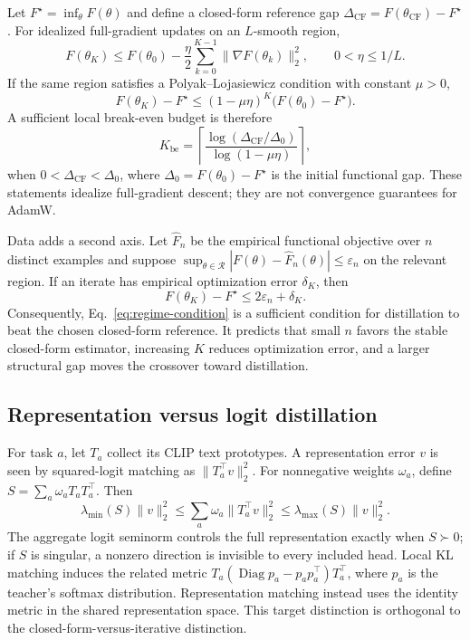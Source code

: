 \documentclass[letterpaper]{article} %
\theoremstyle{plain}
\theoremstyle{definition}
\begin{document}
Let $F^\star=\inf_\theta F(\theta)$ and define a closed-form reference gap $\Delta_{\mathrm{CF}}=F(\theta_{\mathrm{CF}})-F^\star$.
For idealized full-gradient updates on an $L$-smooth region,
\begin{equation}
F(\theta_K)
\le F(\theta_0)-\frac{\eta}{2}
\sum_{k=0}^{K-1}\|\nabla F(\theta_k)\|_2^2,
\qquad 0<\eta\le 1/L.
\label{eq:compute-descent-main}
\end{equation}
If the same region satisfies a Polyak--Lojasiewicz condition with constant $\mu>0$,
\begin{equation}
F(\theta_K)-F^\star
\le(1-\mu\eta)^K\bigl(F(\theta_0)-F^\star\bigr).
\label{eq:compute-rate-main}
\end{equation}
A sufficient local break-even budget is therefore
\begin{equation}
K_{\mathrm{be}}=
\left\lceil
\frac{\log(\Delta_{\mathrm{CF}}/\Delta_0)}
     {\log(1-\mu\eta)}
\right\rceil,
\label{eq:break-even-main}
\end{equation}
when $0<\Delta_{\mathrm{CF}}<\Delta_0$, where $\Delta_0=F(\theta_0)-F^\star$ is the initial functional gap.
These statements idealize full-gradient descent; they are not convergence guarantees for AdamW.

Data adds a second axis.
Let $\widehat F_n$ be the empirical functional objective over $n$ distinct examples and suppose $\sup_{\theta\in\mathcal R}|F(\theta)-\widehat F_n(\theta)|\le\varepsilon_n$ on the relevant region.
If an iterate has empirical optimization error $\delta_K$, then
\begin{equation}
F(\theta_K)-F^\star\le 2\varepsilon_n+\delta_K.
\label{eq:finite-data-bound-main}
\end{equation}
Consequently, Eq.~\eqref{eq:regime-condition} is a sufficient condition for distillation to beat the chosen closed-form reference.
It predicts that small $n$ favors the stable closed-form estimator, increasing $K$ reduces optimization error, and a larger structural gap moves the crossover toward distillation.

\subsection{Representation versus logit distillation}
\label{sec:head-coverage}

For task $a$, let $T_a$ collect its CLIP text prototypes.
A representation error $v$ is seen by squared-logit matching as $\|T_a^\top v\|_2^2$.
For nonnegative weights $\omega_a$, define $S=\sum_a\omega_aT_aT_a^\top$.
Then
\begin{equation}
\lambda_{\min}(S)\|v\|_2^2
\le\sum_a\omega_a\|T_a^\top v\|_2^2
\le\lambda_{\max}(S)\|v\|_2^2.
\label{eq:frame-main}
\end{equation}
The aggregate logit seminorm controls the full representation exactly when $S\succ0$; if $S$ is singular, a nonzero direction is invisible to every included head.
Local KL matching induces the related metric $T_a(\operatorname{Diag}p_a-p_ap_a^\top)T_a^\top$, where $p_a$ is the teacher's softmax distribution.
Representation matching instead uses the identity metric in the shared representation space.
This target distinction is orthogonal to the closed-form-versus-iterative distinction.
\end{document}
